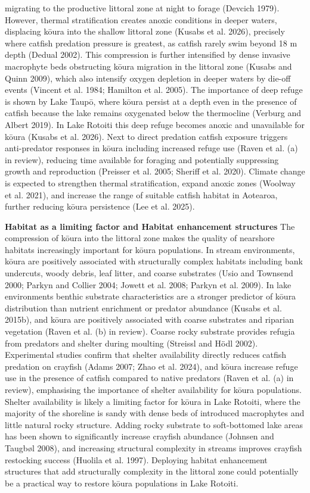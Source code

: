 \documentclass[
  12pt,
  a4paper,
]{scrbook}
\begin{document}
migrating to the productive littoral zone at night to forage (Devcich
1979). However, thermal stratification creates anoxic conditions in
deeper waters, displacing kōura into the shallow littoral zone (Kusabs
et al. 2026), precisely where catfish predation pressure is greatest, as
catfish rarely swim beyond 18 m depth (Dedual 2002). This compression is
further intensified by dense invasive macrophyte beds obstructing kōura
migration in the littoral zone (Kusabs and Quinn 2009), which also
intensify oxygen depletion in deeper waters by die-off events (Vincent
et al. 1984; Hamilton et al. 2005). The importance of deep refuge is
shown by Lake Taupō, where kōura persist at a depth even in the presence
of catfish because the lake remains oxygenated below the thermocline
(Verburg and Albert 2019). In Lake Rotoiti this deep refuge becomes
anoxic and unavailable for kōura (Kusabs et al. 2026). Next to direct
predation catfish exposure triggers anti-predator responses in kōura
including increased refuge use (Raven et al. (a) in review), reducing
time available for foraging and potentially suppressing growth and
reproduction (Preisser et al. 2005; Sheriff et al. 2020). Climate change
is expected to strengthen thermal stratification, expand anoxic zones
(Woolway et al. 2021), and increase the range of suitable catfish
habitat in Aotearoa, further reducing kōura persistence (Lee et al.
2025).

\textbf{Habitat as a limiting factor and Habitat enhancement structures}
The compression of kōura into the littoral zone makes the quality of
nearshore habitats increasingly important for kōura populations. In
stream environments, kōura are positively associated with structurally
complex habitats including bank undercuts, woody debris, leaf litter,
and coarse substrates (Usio and Townsend 2000; Parkyn and Collier 2004;
Jowett et al. 2008; Parkyn et al. 2009). In lake environments benthic
substrate characteristics are a stronger predictor of kōura distribution
than nutrient enrichment or predator abundance (Kusabs et al. 2015b),
and kōura are positively associated with coarse substrates and riparian
vegetation (Raven et al. (b) in review). Coarse rocky substrate provides
refugia from predators and shelter during moulting (Streissl and Hödl
2002). Experimental studies confirm that shelter availability directly
reduces catfish predation on crayfish (Adams 2007; Zhao et al. 2024),
and kōura increase refuge use in the presence of catfish compared to
native predators (Raven et al. (a) in review), emphasising the
importance of shelter availability for kōura populations. Shelter
availability is likely a limiting factor for kōura in Lake Rotoiti,
where the majority of the shoreline is sandy with dense beds of
introduced macrophytes and little natural rocky structure. Adding rocky
substrate to soft-bottomed lake areas has been shown to significantly
increase crayfish abundance (Johnsen and Taugbøl 2008), and increasing
structural complexity in streams improves crayfish restocking success
(Huolila et al. 1997). Deploying habitat enhancement structures that add
structurally complexity in the littoral zone could potentially be a
practical way to restore kōura populations in Lake Rotoiti.
\end{document}
